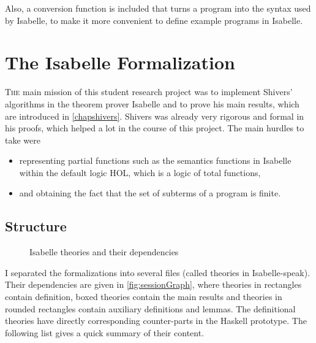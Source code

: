 \documentclass[a4paper,halfparskip,DIV=10,11pt]{scrbook}
\begin{document}
Also, a conversion function is included that turns a program into the syntax used by Isabelle, to make it more convenient to define example programs in Isabelle.

\chapter{The Isabelle Formalization}
\label{chapisabelle}

\lettrine[lines=3]T{he} main mission of this student research project was to implement Shivers’ algorithms in the theorem prover Isabelle\citep{isabelle} and to prove his main results, which are introduced in \cref{chapshivers}. Shivers was already very rigorous and formal in his proofs, which helped a lot in the course of this project. The main hurdles to take were

\begin{itemize}
\item representing partial functions such as the semantics functions in Isabelle within the default logic HOL, which is a logic of total functions,
\item and obtaining the fact that the set of subterms of a program is finite.
\end{itemize}

\section{Structure}

\begin{figure}
\begin{framed}
\centering

\end{framed}
\caption{Isabelle theories and their dependencies}
\label{fig:sessionGraph}
\end{figure}

I separated the formalizations into several files (called theories in Isabelle-speak). Their dependencies are given in \vref{fig:sessionGraph}, where theories in rectangles contain definition, boxed theories contain the main results and theories in rounded rectangles contain auxiliary definitions and lemmas. The definitional theories have directly corresponding counter-parts in the Haskell prototype. The following list gives a quick summary of their content.
\end{document}
